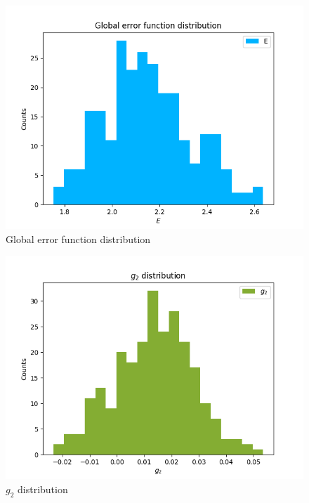 \documentclass[
]{article}
\begin{document}
\begin{figure}
\centering
\includegraphics{pngplots/GlobalErrorFunction.png}
\caption{Global error function distribution}
\end{figure}

\begin{figure}
\centering
\includegraphics{pngplots/param0.png}
\caption{\(g_2\) distribution}
\end{figure}
\end{document}
